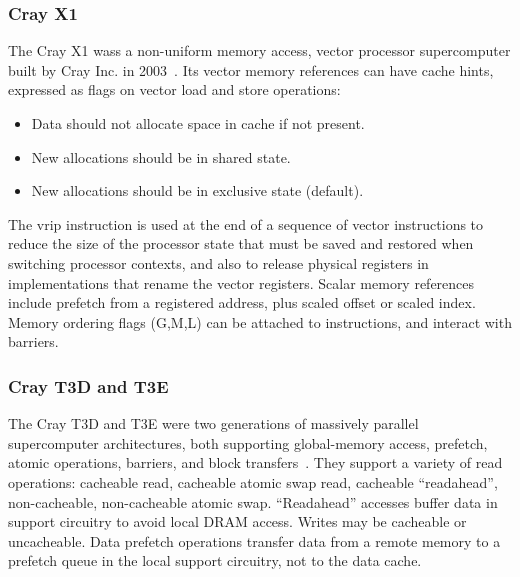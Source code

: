 \subsubsection{Cray X1}

The Cray X1 wass a non-uniform memory access, vector processor supercomputer built by Cray Inc. in 2003~\cite{crayx1}.
Its vector memory references can have cache hints, expressed as flags on vector load and store operations:
\begin{itemize}
\item Data should not allocate space in cache if not present.
\item New allocations should be in shared state.
\item New allocations should be in exclusive state (default).
\end{itemize}

The vrip instruction is used at the end of a sequence of vector instructions to reduce the size of the processor state that must be saved and restored when switching processor contexts, and also to release physical registers in implementations that rename the vector registers.
Scalar memory references include prefetch from a registered address, plus scaled offset or scaled index.
Memory ordering flags (G,M,L) can be attached to instructions, and interact with barriers.

\subsubsection{Cray T3D and T3E}

The Cray T3D and T3E were two generations of massively parallel supercomputer architectures, both supporting
global-memory access, prefetch, atomic operations, barriers, and block transfers~\cite{Arpaci:1995:EEC:225830.224443, crayt3d, crayt3e}.
They support a variety of read operations: cacheable read, cacheable atomic swap read, cacheable ``readahead'', non-cacheable, non-cacheable atomic swap. ``Readahead'' accesses buffer data in support circuitry to avoid local DRAM access.
Writes may be cacheable or uncacheable.
Data prefetch operations transfer data from a remote memory to a prefetch queue in the local support circuitry, not to the data cache.

